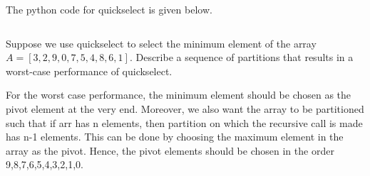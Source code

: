 \begin{prob}
    The python code for quickselect is given below.

    \inputminted{python}{\thisdir/include/part_a.py}

    \begin{subprobset}

            \begin{subprob}
                Suppose we use quickselect to select the minimum element of the array $A = [3, 2, 9, 0, 7, 5, 4, 8, 6, 1]$. Describe a sequence of partitions that results in a worst-case performance of quickselect.

                \begin{soln}
                    For the worst case performance, the minimum element should be chosen as the pivot element at the very end. Moreover, we also want the array to be partitioned such that if arr has n elements, then partition on which the recursive call is made has n-1 elements. This can be done by choosing the maximum element in the array as the pivot. Hence, the pivot elements should be chosen in the order 9,8,7,6,5,4,3,2,1,0.
                \end{soln}

            \end{subprob}

    \end{subprobset}

\end{prob}
